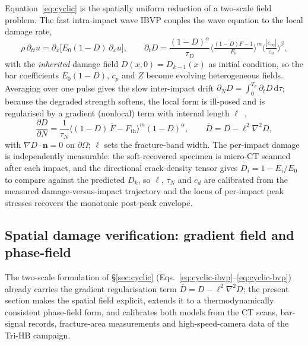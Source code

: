 \documentclass[sn-basic]{sn-jnl}
\begin{document}
Equation~\eqref{eq:cyclic} is the spatially uniform reduction of a two-scale
field problem. The fast intra-impact wave IBVP couples the wave equation to the
local damage rate,
\begin{equation}
\rho\,\partial_{tt}u=\partial_x\!\big[E_0(1-D)\,\partial_x u\big],\qquad
\partial_t D=\frac{(1-D)^{\alpha}}{\tau_D}\Big\langle\tfrac{(1-D)F-1}{F_0}\Big\rangle^{m}\Big(\tfrac{|\dot\varepsilon_{\mathrm{eq}}|}{\dot\varepsilon_0}\Big)^{\beta},
\label{eq:cyclic-ibvp}
\end{equation}
with the \emph{inherited} damage field $D(x,0)=D_{k-1}(x)$ as initial condition,
so the bar coefficients $E_0(1-D)$, $c_p$ and $Z$ become evolving heterogeneous
fields. Averaging over one pulse gives the slow inter-impact drift
$\partial_N D=\int_0^{T_p}\partial_t D\,\mathrm{d}\tau$; because the degraded
strength softens, the local form is ill-posed and is regularised by a gradient
(nonlocal) term with internal length $\ell$~\citep{pijaudier1987},
\begin{equation}
\frac{\partial D}{\partial N}=\frac{1}{\tau_N}\big\langle(1-D)\,\bar F-F_{\mathrm{th}}\big\rangle^{m}(1-D)^{\alpha},
\qquad \bar D=D-\ell^2\nabla^2 D,
\label{eq:cyclic-bvp}
\end{equation}
with $\nabla D\cdot\mathbf{n}=0$ on $\partial\Omega$; $\ell$ sets the
fracture-band width. The per-impact damage is independently measurable: the
soft-recovered specimen is micro-CT scanned after each impact, and the directional
crack-density tensor gives $D_i=1-E_i/E_0$ to compare against the predicted $D_k$,
so $\ell$, $\tau_N$ and $c_d$ are calibrated from the measured
damage-versus-impact trajectory and the locus of per-impact peak stresses recovers
the monotonic post-peak envelope.

\subsection{Spatial damage verification: gradient field and phase-field}\label{sec:spatial}

The two-scale formulation of \S\ref{sec:cyclic}
(Eqs.~\eqref{eq:cyclic-ibvp}--\eqref{eq:cyclic-bvp}) already carries the gradient
regularisation term $\bar D=D-\ell^2\nabla^2 D$; the present section makes the
spatial field explicit, extends it to a thermodynamically consistent phase-field
form, and calibrates both models from the CT scans, bar-signal records, fracture-area
measurements and high-speed-camera data of the Tri-HB campaign.
\end{document}
